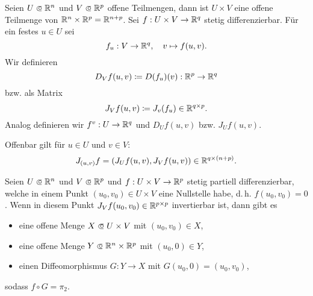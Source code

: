 \documentclass{cheat-sheet}
\begin{document}
\begin{nota}
  Seien $U \opn \R^n$ und $V \opn \R^p$ offene Teilmengen, dann ist $U \times V$ eine offene Teilmenge von $\mathbb{R}^n \times \mathbb{R}^p = \mathbb{R}^{n + p}$. Sei $f : U \times V \to \mathbb{R}^q$ stetig differenzierbar. Für ein festes $u \in U$ sei
  \[ f_u : V \to \mathbb{R}^q,\quad v \mapsto f(u, v). \]
  Wir definieren
  \[ D_V f(u, v) \coloneqq D(f_u)(v) : \mathbb{R}^p \to \mathbb{R}^q \]
  bzw. als Matrix
  \[ J_V f(u, v) \coloneqq J_v(f_u) \in \mathbb{R}^{q \times p}. \]
  Analog definieren wir $f^v : U \to \mathbb{R}^q$ und $D_U f(u, v)$ bzw. $J_U f(u, v)$.
\end{nota}

\begin{bem}
  Offenbar gilt für $u \in U$ und $v \in V$:
  \[ J_{(u, v)} f = \left( J_U f(u, v), J_V f(u, v) \right) \in \mathbb{R}^{q \times (n + p)}. \]
\end{bem}

\begin{satz}
  Seien $U \opn \R^n$ und $V \opn \R^p$ und $f : U \times V \to \mathbb{R}^p$ stetig partiell differenzierbar, welche in einem Punkt $(u_0, v_0) \in U \times V$ eine Nullstelle habe, d.\,h. $f(u_0, v_0) = 0$. Wenn in diesem Punkt $J_V f(u_0, v_0) \in \mathbb{R}^{p \times p}$ invertierbar ist, dann gibt es
  \begin{itemize}
    \item eine offene Menge $X \opn U \times V$ mit $(u_0, v_0) \in X$,
    \item eine offene Menge $Y \opn \R^n \times \R^p$ mit $(u_0, 0) \in Y$,
    \item einen Diffeomorphismus $G : Y \to X$ mit $G(u_0, 0) = (u_0, v_0)$,
  \end{itemize}
  sodass $f \circ G = \pi_2.$
\end{satz}
\end{document}
